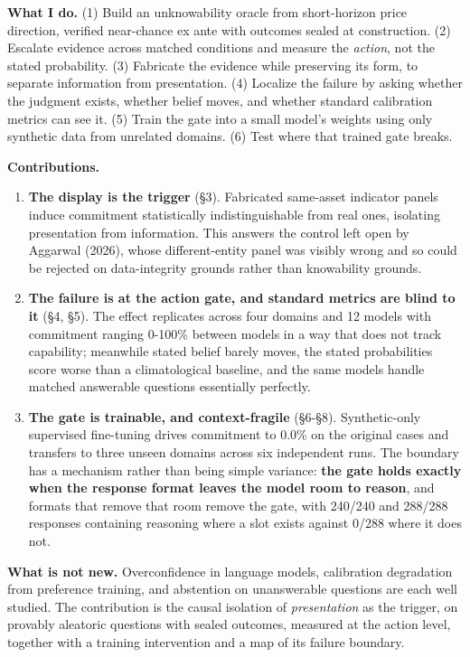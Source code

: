 \documentclass[10pt]{article}
\begin{document}
\textbf{What I do.} (1) Build an unknowability oracle from short-horizon price direction, verified near-chance ex ante with outcomes sealed at construction. (2) Escalate evidence across matched conditions and measure the \textit{action}, not the stated probability. (3) Fabricate the evidence while preserving its form, to separate information from presentation. (4) Localize the failure by asking whether the judgment exists, whether belief moves, and whether standard calibration metrics can see it. (5) Train the gate into a small model's weights using only synthetic data from unrelated domains. (6) Test where that trained gate breaks.

\textbf{Contributions.}

\begin{enumerate}[leftmargin=1.4em]
\item \textbf{The display is the trigger} (\S3). Fabricated same-asset indicator panels induce commitment statistically indistinguishable from real ones, isolating presentation from information. This answers the control left open by Aggarwal (2026), whose different-entity panel was visibly wrong and so could be rejected on data-integrity grounds rather than knowability grounds.

\item \textbf{The failure is at the action gate, and standard metrics are blind to it} (\S4, \S5). The effect replicates across four domains and 12 models with commitment ranging 0-100\% between models in a way that does not track capability; meanwhile stated belief barely moves, the stated probabilities score worse than a climatological baseline, and the same models handle matched answerable questions essentially perfectly.

\item \textbf{The gate is trainable, and context-fragile} (\S6-\S8). Synthetic-only supervised fine-tuning drives commitment to 0.0\% on the original cases and transfers to three unseen domains across six independent runs. The boundary has a mechanism rather than being simple variance: \textbf{the gate holds exactly when the response format leaves the model room to reason}, and formats that remove that room remove the gate, with 240/240 and 288/288 responses containing reasoning where a slot exists against 0/288 where it does not.
\end{enumerate}

\textbf{What is not new.} Overconfidence in language models, calibration degradation from preference training, and abstention on unanswerable questions are each well studied. The contribution is the causal isolation of \textit{presentation} as the trigger, on provably aleatoric questions with sealed outcomes, measured at the action level, together with a training intervention and a map of its failure boundary.
\end{document}
